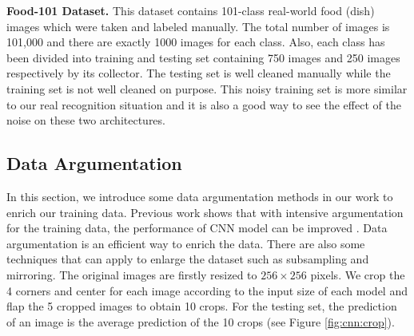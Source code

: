 \textbf{Food-101 Dataset.}
This dataset contains 101-class real-world food (dish) images which were taken and labeled manually. The total number of images is 101,000 and there are exactly 1000 images for each class. Also, each class has been divided into training and testing set containing 750 images and 250 images respectively by its collector. The testing set is well cleaned manually while the training set is not well cleaned on purpose. This noisy training set is more similar to our real recognition situation and it is also a good way to see the effect of the noise on these two architectures.

\subsection{Data Argumentation}
In this section, we introduce some data argumentation methods in our work to enrich our training data. Previous work shows that with intensive argumentation for the training data, the performance of CNN model can be improved \cite{wu2015deep}. 
Data argumentation is an efficient way to enrich the data. There are also some techniques that can apply to enlarge the dataset such as subsampling and mirroring. The original images are firstly resized to $256\times 256$ pixels. We crop the 4 corners and center for each image according to the input size of each model and flap the 5 cropped images to obtain 10 crops. For the testing set, the prediction of an image is the average prediction of the 10 crops (see Figure \ref{fig:cnn:crop}).

